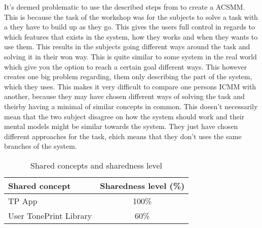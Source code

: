 It's deemed problematic to use the described steps from \textcite{WEB:ConceptMapAnalysis} to create a ACSMM. This is because the task of the workshop was for the subjects to solve a task with a they have to build up as they go. This gives the users full control in regards to which features that exists in the system, how they works and when they wants to use them. This results in the subjects going different ways around the task and solving it in their won way. This is quite similar to some system in the real world which give you the option to reach a certain goal different ways. This however creates one big problem regarding, them only describing the part of the system, which they uses. This makes it very difficult to compare one persons ICMM with another, because they may have chosen different ways of solving the task and theirby having a minimal of similar concepts in common. This doesn't necessarily mean that the two subject disagree on how the system should work and their mental models might be similar towards the system. They just have chosen different approaches for the task, ehich means that they don't uses the same branches of the system. \\


\begin{table}[H]
	\centering
	\begin{tabular}[width=\textwidth]{|l|c|}
	\hline
	Shared concept & Sharedness level (\%) \\ \hline
	TP App & 100\% \\ 
	User TonePrint Library & 60\% \\ \hline
	\end{tabular}
	\caption{Shared concepts and sharedness level}
	\label{tab:SharedConcept}
\end{table}



